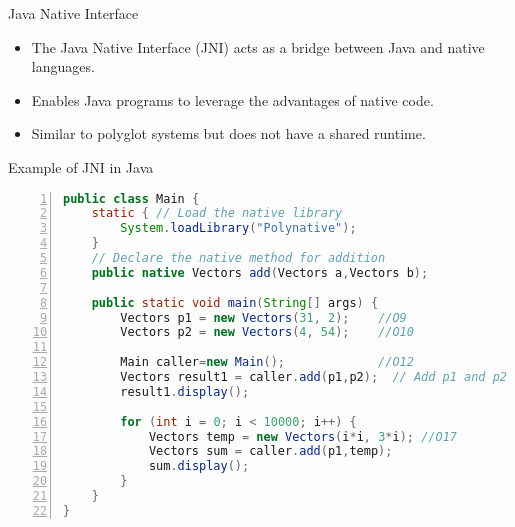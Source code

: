 \begin{frame}
    \centering
    \textbf{}
\end{frame}

\begin{frame}{Java Native Interface}
    \begin{itemize}
        \vspace{3mm}
        \item The Java Native Interface (JNI) acts as a bridge between Java and native languages.
        \vspace{3mm}
        \item Enables Java programs to leverage the advantages of native code.
        \vspace{3mm}
        \item Similar to polyglot systems but does not have a shared runtime.
    \end{itemize}
\end{frame}


\begin{frame}[fragile]{Example of JNI in Java}
    \begin{center}
        \begin{minipage}{0.8\textwidth} %
            \begin{lstlisting}[language=java,
                frame=single,
                numbers=left,
                basicstyle=\tiny\ttfamily,
                caption={Vector arithmetic  },
                captionpos=b,
                backgroundcolor=\color{lightgray},   % Background color
                numberstyle=\color{pink},            % Line number color
                keywordstyle=\color{keywordcolor}\bfseries, % Keywords color
                commentstyle=\color{commentcolor},   % Comment color
                stringstyle=\color{stringcolor}      % String color
            ,label={lst:lstlisting}]
public class Main {
    static { // Load the native library
        System.loadLibrary("Polynative");
    }
    // Declare the native method for addition
    public native Vectors add(Vectors a,Vectors b);

    public static void main(String[] args) {
        Vectors p1 = new Vectors(31, 2);    //O9
        Vectors p2 = new Vectors(4, 54);    //O10

        Main caller=new Main();             //O12
        Vectors result1 = caller.add(p1,p2);  // Add p1 and p2
        result1.display();

        for (int i = 0; i < 10000; i++) {
            Vectors temp = new Vectors(i*i, 3*i); //O17
            Vectors sum = caller.add(p1,temp);
            sum.display();
        }
    }
}
            \end{lstlisting}
        \end{minipage}
    \end{center}
\end{frame}

